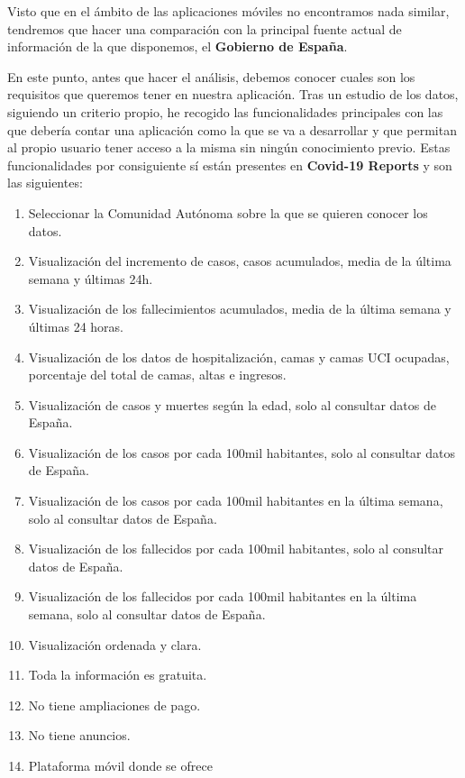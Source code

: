 Visto que en el ámbito de las aplicaciones móviles no encontramos nada similar, tendremos que hacer una comparación con la principal fuente actual de información de la que disponemos, el \textbf{Gobierno de España}.

En este punto, antes que hacer el análisis, debemos conocer cuales son los requisitos que queremos tener en nuestra aplicación. Tras un estudio de los datos, siguiendo un criterio propio, he recogido las funcionalidades principales con las que debería contar una aplicación como la que se va a desarrollar y que permitan al propio usuario tener acceso a la misma sin ningún conocimiento previo. Estas funcionalidades por consiguiente sí están presentes en \textbf{Covid-19 Reports} y son las siguientes:

\begin{enumerate}
	\item Seleccionar la Comunidad Autónoma sobre la que se quieren conocer los datos.
	\item Visualización del incremento de casos, casos acumulados, media de la última semana y últimas 24h.
	\item Visualización de los fallecimientos acumulados, media de la última semana y últimas 24 horas.
	\item Visualización de los datos de hospitalización, camas y camas UCI ocupadas, porcentaje del total de camas, altas e ingresos.
	\item Visualización de casos y muertes según la edad, solo al consultar datos de España.
	\item Visualización de los casos por cada 100mil habitantes, solo al consultar datos de España.
	\item Visualización de los casos por cada 100mil habitantes en la última semana, solo al consultar datos de España.
	\item Visualización de los fallecidos por cada 100mil habitantes, solo al consultar datos de España.
	\item Visualización de los fallecidos por cada 100mil habitantes en la última semana, solo al consultar datos de España.
	\item Visualización ordenada y clara.
	\item Toda la información es gratuita.
	\item No tiene ampliaciones de pago.
	\item No tiene anuncios.
	\item Plataforma móvil donde se ofrece
\end{enumerate}

